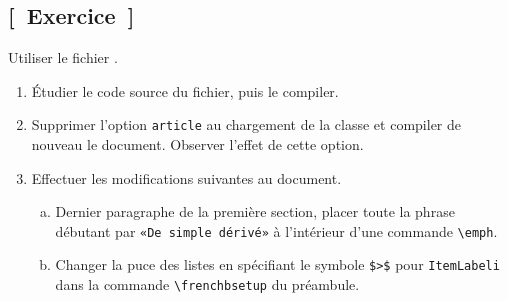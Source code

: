 \subsection{[~Exercice~]}

\begin{exercice}
  Utiliser le fichier .

  \begin{enumerate}
  \item Étudier le code source du fichier, puis le compiler.
  \item Supprimer l'option \texttt{article} au chargement de la classe
    et compiler de nouveau le document. Observer l'effet de cette
    option.
  \item Effectuer les modifications suivantes au document.
    \begin{enumerate}[a)]
    \item Dernier paragraphe de la première section, placer toute la
      phrase débutant par \texttt{«De simple dérivé»} à l'intérieur
      d'une commande \texttt{{\textbackslash}emph}.
    \item Changer la puce des listes en spécifiant le symbole
      \texttt{\$>\$} pour \verb=ItemLabeli= dans la commande
      \verb=\frenchbsetup= du préambule.
    \end{enumerate}
  \end{enumerate}
\end{exercice}

